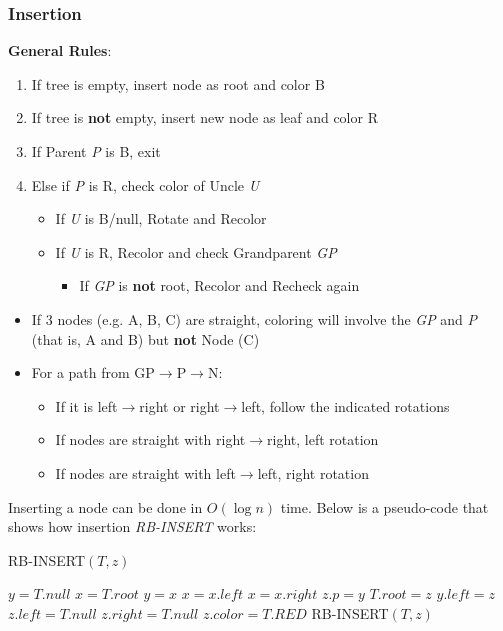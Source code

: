 \documentclass[10pt, 
a4paper, 
oneside, 
headinclude, footinclude, 
BCOR5mm]
{scrartcl}
\begin{document}
\subsubsection{Insertion}
\textbf{General Rules}:
\begin{enumerate}
    \item If tree is empty, insert node as root and color B
    \item If tree is \textbf{not} empty, insert new node as leaf and color R
    \item If Parent \textit{P} is B, exit
    \item Else if \textit{P} is R, check color of Uncle \textit{U}
    \begin{itemize}
        \item If \textit{U} is B/null, Rotate and Recolor
        \item If \textit{U} is R, Recolor and check Grandparent \textit{GP}
        \begin{itemize}
            \item If \textit{GP} is \textbf{not} root, Recolor and Recheck again
        \end{itemize}
    \end{itemize}
\end{enumerate}
\begin{itemize}
    \item If 3 nodes (e.g. A, B, C) are straight, coloring will involve the \textit{GP} and \textit{P} (that is, A and B) but \textbf{not} Node (C)
    \item For a path from GP$\rightarrow$P$\rightarrow$N:
    \begin{itemize}
        \item If it is left$\rightarrow$right or right$\rightarrow$left, follow the indicated rotations
        \item If nodes are straight with right$\rightarrow$right, left rotation 
        \item If nodes are straight with left$\rightarrow$left, right rotation 
    \end{itemize}
\end{itemize}
Inserting a node can be done in $O(\log n)$ time. Below is a pseudo-code that shows how insertion \textit{RB-INSERT} works:
\begin{algorithm}
    \caption{RB-INSERT$(T,z)$}
    \BlankLine
    $y=T.null$\;
    $x=T.root$\;
        {$y=x$\;        
            {$x=x.left$\;}
        {$x=x.right$\;}}
    $z.p=y$\;
        {$T.root=z$\;}
        {$y.left=z$\;}
    $z.left=T.null$\;
    $z.right=T.null$\;
    $z.color=T.RED$\;
    RB-INSERT$(T,z)$\;   
\end{algorithm}
\end{document}
